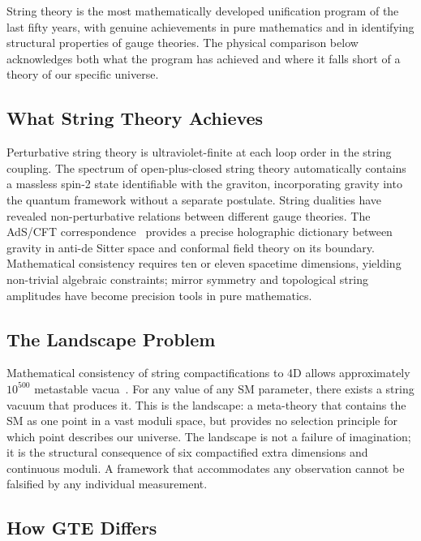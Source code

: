 \documentclass[11pt,openany]{book}
\theoremstyle{remark}
\begin{document}
String theory is the most mathematically developed unification program of the last fifty
years, with genuine achievements in pure mathematics and in identifying structural
properties of gauge theories.  The physical comparison below acknowledges both what the
program has achieved and where it falls short of a theory of our specific universe.

\subsection*{What String Theory Achieves}

Perturbative string theory is ultraviolet-finite at each loop order in the string
coupling.  The spectrum of open-plus-closed string theory automatically contains a
massless spin-2 state identifiable with the graviton, incorporating gravity into the
quantum framework without a separate postulate.  String dualities have revealed
non-perturbative relations between different gauge theories.  The AdS/CFT
correspondence~\cite{Maldacena1998} provides a precise holographic dictionary between
gravity in anti-de Sitter space and conformal field theory on its boundary.  Mathematical
consistency requires ten or eleven spacetime dimensions, yielding non-trivial algebraic
constraints; mirror symmetry and topological string amplitudes have become precision tools
in pure mathematics.

\subsection*{The Landscape Problem}

Mathematical consistency of string compactifications to 4D allows approximately
$10^{500}$ metastable vacua~\cite{Susskind2005}.  For any value of any SM parameter,
there exists a string vacuum that produces it.  This is the landscape: a meta-theory
that contains the SM as one point in a vast moduli space, but provides no selection
principle for which point describes our universe.  The landscape is not a failure of
imagination; it is the structural consequence of six compactified extra dimensions and
continuous moduli.  A framework that accommodates any observation cannot be falsified by
any individual measurement.

\subsection*{How GTE Differs}
\end{document}
